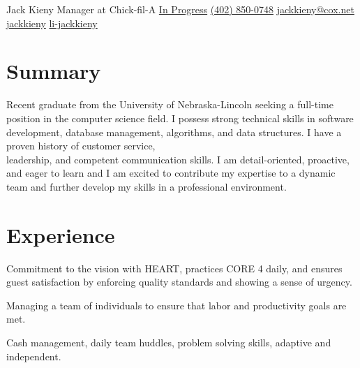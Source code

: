 \documentclass[]{latex/resume}
\begin{document}
%
%

\namesection
    {Jack}
    {Kieny}
    {Manager at Chick-fil-A}
    {\contactline
        {\href{}{In Progress}}
        {\href{tel:+1402850047}{(402) 850-0748}}
        {\href{mailto:jackkieny@cox.net}{jackkieny@cox.net}}
        {\href{https://www.github.com/jackkieny}{jackkieny}}
        {\href{https://www.linkedin.com/in/jackkieny}{li-jackkieny}}
    }       
        

%
%

\begin{minipage}[t]{0.75\textwidth} 

\section{Summary}
Recent graduate from the University of Nebraska-Lincoln seeking a full-time position in the computer science field.
I possess strong technical skills in software development, database management, algorithms, and data structures.
I have a proven history of customer service,\\leadership, and competent communication skills.
I am detail-oriented, proactive, and eager to learn and 
I am excited to contribute my expertise to a dynamic team and further develop my skills in a professional environment.

\sectionsep


\section{Experience}
     
    \vspace{\topsep} %
    \begin{tightemize}
        \sectionsep
            \item Commitment to the vision with HEART, practices CORE 4 daily, and ensures guest satisfaction by enforcing quality standards and showing a sense of urgency.
            \item Managing a team of individuals to ensure that labor and productivity goals are met.
            \item Cash management, daily team huddles, problem solving skills, adaptive and independent.
    \end{tightemize}
    

\end{minipage}
\end{document}
